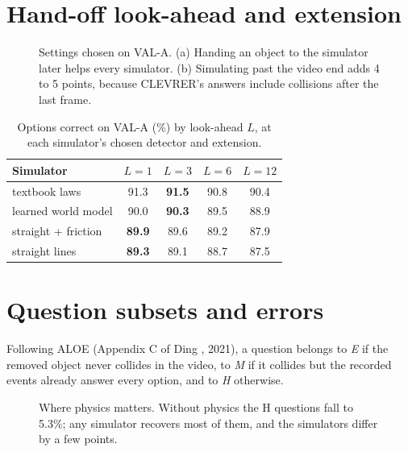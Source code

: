 \section{Hand-off look-ahead and extension}
\label{app:sweeps}

\begin{figure}[h]
\centering
{}
\caption{Settings chosen on VAL-A. (a) Handing an object to the simulator later helps every simulator. (b) Simulating past the video end adds 4 to 5 points, because CLEVRER's answers include collisions after the last frame.}
\label{fig:sweeps}
\end{figure}

\begin{table}[h]
\caption{Options correct on VAL-A (\%) by look-ahead $L$, at each simulator's chosen detector and extension.}
\label{tab:lookahead}
\centering
\small
\begin{tabular}{@{}lcccc@{}}
\toprule
Simulator & $L=1$ & $L=3$ & $L=6$ & $L=12$ \\
\midrule
textbook laws & 91.3 & \textbf{91.5} & 90.8 & 90.4 \\
learned world model & 90.0 & \textbf{90.3} & 89.5 & 88.9 \\
straight + friction & \textbf{89.9} & 89.6 & 89.2 & 87.9 \\
straight lines & \textbf{89.3} & 89.1 & 88.7 & 87.5 \\
\bottomrule
\end{tabular}
\end{table}

\section{Question subsets and errors}
\label{app:subsets}

Following ALOE (Appendix C of Ding \etal, 2021), a question belongs to \emph{E} if the removed object never collides in the video, to \emph{M} if it collides but the recorded events already answer every option, and to \emph{H} otherwise.

\begin{figure}[h]
\centering
{}
\caption{Where physics matters. Without physics the H questions fall to 5.3\%; any simulator recovers most of them, and the simulators differ by a few points.}
\label{fig:subsets}
\end{figure}

